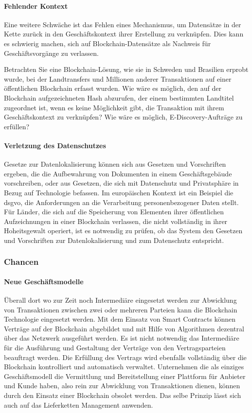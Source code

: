 \paragraph{Fehlender Kontext}
Eine weitere Schwäche ist das Fehlen eines Mechanismus, um Datensätze in der Kette zurück in den Geschäftskontext ihrer Erstellung zu verknüpfen. Dies kann es schwierig machen, sich auf Blockchain-Datensätze als Nachweis für Geschäftsvorgänge zu verlassen.

Betrachten Sie eine Blockchain-Lösung, wie sie in Schweden und Brasilien erprobt wurde, bei der Landtransfers und Millionen anderer Transaktionen auf einer öffentlichen Blockchain erfasst wurden. Wie wäre es möglich, den auf der Blockchain aufgezeichneten Hash abzurufen, der einem bestimmten Landtitel zugeordnet ist, wenn es keine Möglichkeit gibt, die Transaktion mit ihrem Geschäftskontext zu verknüpfen? Wie wäre es möglich, E-Discovery-Aufträge zu erfüllen?

\paragraph{Verletzung des Datenschutzes}
Gesetze zur Datenlokalisierung können sich aus Gesetzen und Vorschriften ergeben, die die Aufbewahrung von Dokumenten in einem Geschäftsgebäude vorschreiben, oder aus Gesetzen, die sich mit Datenschutz und Privatsphäre in Bezug auf Technologie befassen. Im europäischen Kontext ist ein Beispiel die \ac{dsgvo}, die Anforderungen an die Verarbeitung personenbezogener Daten stellt. Für Länder, die sich auf die Speicherung von Elementen ihrer öffentlichen Aufzeichnungen in einer Blockchain verlassen, die nicht vollständig in ihrer Hoheitsgewalt operiert, ist es notwendig zu prüfen, ob das System den Gesetzen und Vorschriften zur Datenlokalisierung und zum Datenschutz entspricht.

\subsubsection{Chancen}
\paragraph{Neue Geschäftsmodelle}
Überall dort wo zur Zeit noch Intermediäre eingesetzt werden zur Abwicklung von Transaktionen zwischen zwei oder mehreren Parteien kann die Blockchain Technologie eingesetzt werden. Mit dem Einsatz von Smart Contracts können Verträge auf der Blockchain abgebildet und mit Hilfe von Algorithmen dezentral über das Netzwerk ausgeführt werden. Es ist nicht notwendig das Intermediäre für die Ausführung und Gestaltung der Verträge von den Vertragsparteien beauftragt werden. Die Erfüllung des Vertrags wird ebenfalls vollständig über die Blockchain kontrolliert und automatisch verwaltet. Unternehmen die als einziges Geschäftsmodell die Vermittlung und Bereitstellung einer Plattform für Anbieter und Kunde haben, also rein zur Abwicklung von Transaktionen dienen, können durch den Einsatz einer Blockchain obsolet werden. Das selbe Prinzip lässt sich auch auf das Lieferketten Management anwenden. 

